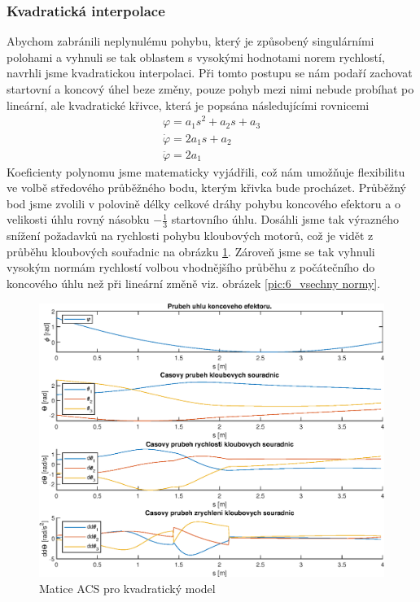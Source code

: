 \documentclass{article}
\begin{document}
			\subsubsection{Kvadratická interpolace}	
					Abychom zabránili neplynulému pohybu, který je způsobený singulárními polohami a vyhnuli se tak oblastem s vysokými hodnotami norem rychlostí, navrhli jsme kvadratickou interpolaci. Při tomto postupu se nám podaří zachovat startovní a koncový úhel beze změny, pouze pohyb mezi nimi nebude probíhat po lineární, ale kvadratické křivce, která je popsána následujícími rovnicemi
						\begin{align}
						\varphi = a_1s^2+a_2s+a_3\\
						\dot{\varphi} = 2a_1s+a_2\\
						\ddot{\varphi} = 2a_1
					\end{align}
				Koeficienty polynomu jsme matematicky vyjádřili, což nám umožňuje flexibilitu ve volbě středového průběžného bodu, kterým křivka bude procházet. Průběžný bod jsme zvolili v polovině délky celkové dráhy pohybu koncového efektoru a o velikosti úhlu rovný násobku \(-\frac{1}{3}\) startovního úhlu. Dosáhli jsme tak výrazného snížení požadavků na rychlosti pohybu kloubových motorů, což je vidět z průběhu kloubových souřadnic na obrázku \ref{pic:6_kloubove souradnice_quad}. Zároveň jsme se tak vyhnuli vysokým normám rychlostí volbou vhodnějšího průběhu z počátečního do koncového úhlu než při lineární změně viz. obrázek \ref{pic:6_vsechny normy}.
			\begin{figure}[H]
				\centering
				\includegraphics[width=\textwidth]{./Graphics/6_Graphics/Kloub_souradnice_quad.eps}
				\caption{Matice ACS pro kvadratický model}
				\label{pic:6_kloubove souradnice_quad}
			\end{figure}
\end{document}
